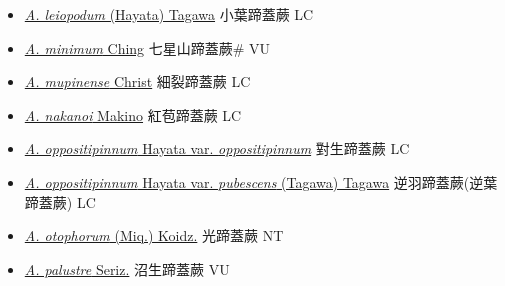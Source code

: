 \begin{itemize}
\begin{itemize}
        \item[] \href{http://www.theplantlist.org/tpl1.1/search?q=Athyrium+leiopodum}{\textit{A. leiopodum} (Hayata) Tagawa}   小葉蹄蓋蕨 LC
        \item[] \href{http://www.theplantlist.org/tpl1.1/search?q=Athyrium+minimum}{\textit{A. minimum} Ching}   七星山蹄蓋蕨\# VU
        \item[] \href{http://www.theplantlist.org/tpl1.1/search?q=Athyrium+mupinense}{\textit{A. mupinense} Christ}     細裂蹄蓋蕨 LC
        \item[] \href{http://www.theplantlist.org/tpl1.1/search?q=Athyrium+nakanoi}{\textit{A. nakanoi} Makino}   紅苞蹄蓋蕨 LC
        \item[] \href{http://www.theplantlist.org/tpl1.1/search?q=Athyrium+oppositipinnum+var.+oppositipinnum}{\textit{A. oppositipinnum} Hayata var. \textit{oppositipinnum}}   對生蹄蓋蕨 LC
        \item[] \href{http://www.theplantlist.org/tpl1.1/search?q=Athyrium+oppositipinnum+var.+pubescens}{\textit{A. oppositipinnum} Hayata var. \textit{pubescens} (Tagawa) Tagawa}     逆羽蹄蓋蕨(逆葉蹄蓋蕨)   LC
        \item[] \href{http://www.theplantlist.org/tpl1.1/search?q=Athyrium+otophorum}{\textit{A. otophorum} (Miq.) Koidz.}   光蹄蓋蕨 NT
        \item[] \href{http://www.theplantlist.org/tpl1.1/search?q=Athyrium+palustre}{\textit{A. palustre} Seriz.}   沼生蹄蓋蕨 VU

\end{itemize}
\end{itemize}
